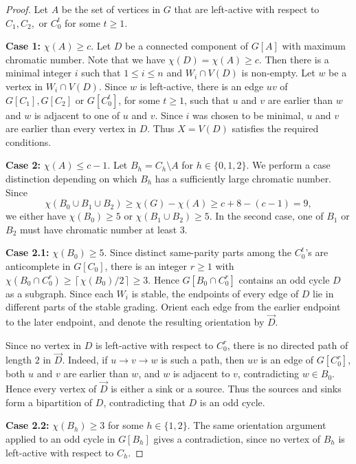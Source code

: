 \documentclass[10pt,a4paper]{amsart}
\begin{document}
\begin{proof}
    Let $A$ be the set of vertices in $G$ that are left-active with respect to $C_1, C_2,$ or $C_0^t$ for some $t \geq 1$. 

    \textbf{Case 1:} $\chi(A) \geq c$.
    Let $D$ be a connected component of $G[A]$ with maximum chromatic number. Note that we have $\chi(D) = \chi(A) \geq c$. Then there is a minimal integer $i$ such that $1 \leq i \leq n$ and $W_i \cap V(D)$ is non-empty. Let $w$ be a vertex in $W_i \cap V(D)$. Since $w$ is left-active, there is an edge $uv$ of $G[C_1], G[C_2]$ or $G[C_0^t]$, for some $t \geq 1$, such that $u$ and $v$ are earlier than $w$ and $w$ is adjacent to one of $u$ and $v$. Since $i$ was chosen to be minimal, $u$ and $v$ are earlier than every vertex in $D$. Thus $X = V(D)$ satisfies the required conditions.

    \textbf{Case 2:} $\chi(A) \leq c - 1$.
    Let $B_h = C_h \setminus A$ for $h \in \{0, 1, 2\}$. We perform a case distinction depending on which $B_h$ has a sufficiently large chromatic number.
    Since 
    \[\chi(B_0 \cup B_1 \cup B_2) \geq \chi(G) - \chi(A) \geq c + 8 - (c -1) = 9,\]
    we either have $\chi(B_0) \geq 5$ or $\chi(B_1 \cup B_2) \geq 5$. In the second case, one of $B_1$ or $B_2$ must have chromatic number at least $3$.

    \textbf{Case 2.1:} $\chi(B_0) \geq 5$.
    Since distinct same-parity parts among the \(C_0^t\)'s are anticomplete in \(G[C_0]\), there is an integer $r \geq 1$ with $\chi(B_0 \cap C_0^{r}) \geq \left\lceil \chi(B_0) / 2 \right\rceil \geq 3$.
    Hence \(G[B_0 \cap C_0^r]\) contains an odd cycle \(D\) as a subgraph. Since each \(W_i\) is stable, the endpoints of every edge of \(D\) lie in different parts of the stable grading. Orient each edge from the earlier endpoint to the later endpoint, and denote the resulting orientation by \(\vec D\).

    Since no vertex in \(D\) is left-active with respect to \(C_0^r\), there is no directed path of length \(2\) in \(\vec D\). Indeed, if \(u \to v \to w\) is such a path, then \(uv\) is an edge of \(G[C_0^r]\), both \(u\) and \(v\) are earlier than \(w\), and \(w\) is adjacent to \(v\), contradicting \(w\in B_0\).
    Hence every vertex of \(\vec D\) is either a sink or a source. Thus the sources and sinks form a bipartition of \(D\), contradicting that \(D\) is an odd cycle. 

    \textbf{Case 2.2:} $\chi(B_h) \geq 3$ for some $h \in \{1, 2\}$.
    The same orientation argument applied to an odd cycle in \(G[B_h]\) gives a contradiction, since no vertex of \(B_h\) is left-active with respect to \(C_h\).
\end{proof}
\end{document}
